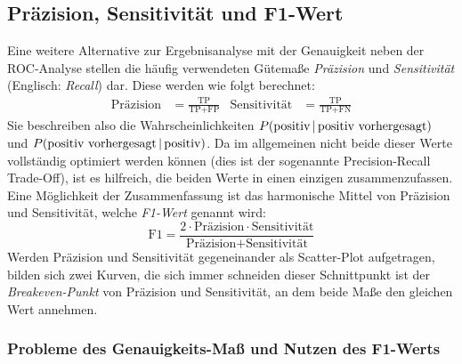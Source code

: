 		\subsection{Präzision, Sensitivität und F1-Wert}
			Eine weitere Alternative zur Ergebnisanalyse mit der Genauigkeit neben der ROC-Analyse stellen die häufig verwendeten Gütemaße \emph{Präzision} und \emph{Sensitivität} (Englisch: \emph{Recall}) dar. Diese werden wie folgt berechnet:
			\begin{align}
				\text{Präzision} &= \frac{\text{TP}}{\text{TP} + \text{FP}}
				&
				\text{Sensitivität} &= \frac{\text{TP}}{\text{TP} + \text{FN}}
			\end{align}
			Sie beschreiben also die Wahrscheinlichkeiten \( P(\text{positiv} \,\vert\, \text{positiv vorhergesagt}) \) und \( P(\text{positiv vorhergesagt} \,\vert\, \text{positiv}) \). Da im allgemeinen nicht beide dieser Werte vollständig optimiert werden können (dies ist der sogenannte Precision-Recall Trade-Off), ist es hilfreich, die beiden Werte in einen einzigen zusammenzufassen. Eine Möglichkeit der Zusammenfassung ist das harmonische Mittel von Präzision und Sensitivität, welche \emph{F1-Wert} genannt wird:
			\begin{equation}
				\text{F1} = \frac{2 \cdot \text{Präzision} \cdot \text{Sensitivität}}{\text{Präzision} + \text{Sensitivität}}
			\end{equation}
			Werden Präzision und Sensitivität gegeneinander als Scatter-Plot aufgetragen, bilden sich zwei Kurven, die sich immer schneiden dieser Schnittpunkt ist der \emph{Breakeven-Punkt} von Präzision und Sensitivität, an dem beide Maße den gleichen Wert annehmen.

			\subsubsection{Probleme des Genauigkeits-Maß und Nutzen des F1-Werts}
				\label{subsubsec:accuracyProblems}

